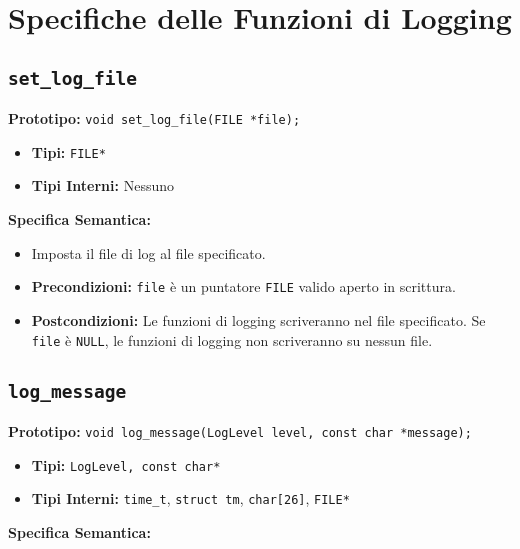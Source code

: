 \documentclass{article}
\begin{document}
\section{Specifiche delle Funzioni di Logging}

\subsection{\texttt{set\_log\_file}}
\textbf{Prototipo:} \texttt{void set\_log\_file(FILE *file);}

\begin{itemize}[label=--,leftmargin=*]
    \item \textbf{Tipi:} \texttt{FILE*}
    \item \textbf{Tipi Interni:} Nessuno
\end{itemize}


\flushleft
\textbf{Specifica Semantica:}

\begin{itemize}[label=--,leftmargin=*]
    \item Imposta il file di log al file specificato.
    \item \textbf{Precondizioni:} \texttt{file} è un puntatore \texttt{FILE} valido aperto in scrittura.
    \item \textbf{Postcondizioni:} Le funzioni di logging scriveranno nel file specificato. Se \texttt{file} è \texttt{NULL}, le funzioni di logging non scriveranno su nessun file.
\end{itemize}

\subsection{\texttt{log\_message}}
\textbf{Prototipo:} \texttt{void log\_message(LogLevel level, const char *message);}

\begin{itemize}[label=--,leftmargin=*]
    \item \textbf{Tipi:} \texttt{LogLevel, const char*}
    \item \textbf{Tipi Interni:} \texttt{time\_t}, \texttt{struct tm}, \texttt{char[26]}, \texttt{FILE*}
\end{itemize}

\flushleft
\textbf{Specifica Semantica:}
\end{document}
